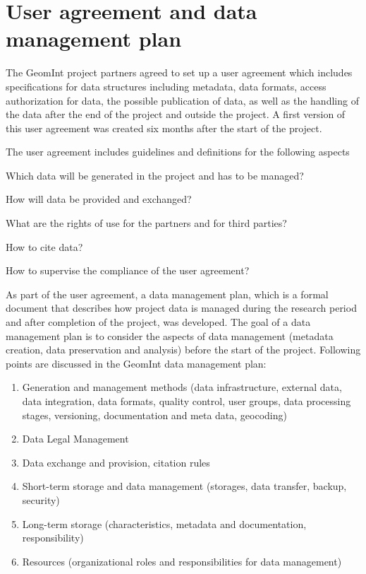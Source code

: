 \section{User agreement and data management plan}

The GeomInt project partners agreed to set up a user agreement which includes specifications for data structures including metadata, data formats, access authorization for data, the possible publication of data, as well as the handling of the data after the end of the project and outside the project. A first version of this user agreement was created six months after the start of the project. 

The user agreement includes guidelines and definitions for the following aspects 

\begin{list}{-}{\leftmargin=1em \itemindent=0em \itemsep=0.1em}
\item Which data will be generated in the project and has to be managed?
\item How will data be provided and exchanged?
\item What are the rights of use for the partners and for third parties?
\item How to cite data?
\item How to supervise the compliance of the user agreement?
\end{list}

As part of the user agreement, a data management plan, which is a formal document that describes how project data is managed during the research period and after completion of the project, was developed. The goal of a data management plan is to consider the aspects of data management (metadata creation, data preservation and analysis) before the start of the project. Following points are discussed in the GeomInt data management plan:

\begin{enumerate}{\leftmargin=1em \itemindent=0em \itemsep=0.1em}
\item Generation and management methods (data infrastructure, external data, data integration, data formats, quality control, user groups, data processing stages, versioning, documentation and meta data, geocoding)
\item Data Legal Management
\item Data exchange and provision, citation rules
\item Short-term storage and data management (storages, data transfer, backup, security)
\item Long-term storage (characteristics, metadata and documentation, responsibility)
\item Resources (organizational roles and responsibilities for data management)
\end{enumerate}

